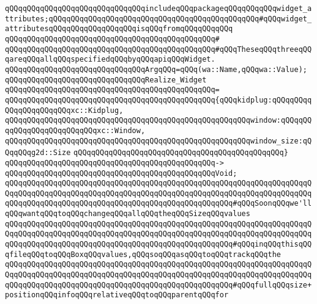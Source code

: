 \verb|qQQqqQQqqQQqqQQqqQQqqQQqqQQqqQQqincludeqQQqpackageqQQqqQQqqQQqwidget_attributes;qQQqqQQqqQQqqQQqqQQqqQQqqQQqqQQqqQQqqQQqqQQqqQQq#qQQqwidget_attributesqQQqqQQqqQQqqQQqqQQqisqQQqfromqQQqqQQqqQQq|\newline
\verb|qQQqqQQqqQQqqQQqqQQqqQQqqQQqqQQqqQQqqQQqqQQqqQQq#|\newline
\verb|qQQqqQQqqQQqqQQqqQQqqQQqqQQqqQQqqQQqqQQqqQQqqQQq#qQQqTheseqQQqthreeqQQqareqQQqallqQQqspecifiedqQQqbyqQQqapiqQQqWidget.|\newline
\newline
\verb|qQQqqQQqqQQqqQQqqQQqqQQqqQQqqQQqArgqQQq=qQQq(wa::Name,qQQqwa::Value);|\newline
\newline
\verb|qQQqqQQqqQQqqQQqqQQqqQQqqQQqqQQqRealize_Widget|\newline
\verb|qQQqqQQqqQQqqQQqqQQqqQQqqQQqqQQqqQQqqQQqqQQqqQQq=|\newline
\verb|qQQqqQQqqQQqqQQqqQQqqQQqqQQqqQQqqQQqqQQqqQQqqQQq{qQQqkidplug:qQQqqQQqqQQqqQQqqQQqqQQqxc::Kidplug,|\newline
\verb|qQQqqQQqqQQqqQQqqQQqqQQqqQQqqQQqqQQqqQQqqQQqqQQqqQQqqQQqwindow:qQQqqQQqqQQqqQQqqQQqqQQqqQQqxc::Window,|\newline
\verb|qQQqqQQqqQQqqQQqqQQqqQQqqQQqqQQqqQQqqQQqqQQqqQQqqQQqqQQqwindow_size:qQQqqQQqg2d::Size|\newline
\verb|qQQqqQQqqQQqqQQqqQQqqQQqqQQqqQQqqQQqqQQqqQQqqQQq}|\newline
\verb|qQQqqQQqqQQqqQQqqQQqqQQqqQQqqQQqqQQqqQQqqQQqqQQq->|\newline
\verb|qQQqqQQqqQQqqQQqqQQqqQQqqQQqqQQqqQQqqQQqqQQqqQQqVoid;|\newline
\verb|qQQqqQQqqQQqqQQqqQQqqQQqqQQqqQQqqQQqqQQqqQQqqQQqqQQqqQQqqQQqqQQqqQQqqQQqqQQqqQQqqQQqqQQqqQQqqQQqqQQqqQQqqQQqqQQqqQQqqQQqqQQqqQQqqQQqqQQqqQQqqQQqqQQqqQQqqQQqqQQqqQQqqQQqqQQqqQQqqQQqqQQqqQQqqQQq#qQQqSoonqQQqwe'llqQQqwantqQQqtoqQQqchangeqQQqallqQQqtheqQQqSizeqQQqvalues|\newline
\verb|qQQqqQQqqQQqqQQqqQQqqQQqqQQqqQQqqQQqqQQqqQQqqQQqqQQqqQQqqQQqqQQqqQQqqQQqqQQqqQQqqQQqqQQqqQQqqQQqqQQqqQQqqQQqqQQqqQQqqQQqqQQqqQQqqQQqqQQqqQQqqQQqqQQqqQQqqQQqqQQqqQQqqQQqqQQqqQQqqQQqqQQqqQQqqQQq#qQQqinqQQqthisqQQqfileqQQqtoqQQqBoxqQQqvalues,qQQqsoqQQqasqQQqtoqQQqtrackqQQqthe|\newline
\verb|qQQqqQQqqQQqqQQqqQQqqQQqqQQqqQQqqQQqqQQqqQQqqQQqqQQqqQQqqQQqqQQqqQQqqQQqqQQqqQQqqQQqqQQqqQQqqQQqqQQqqQQqqQQqqQQqqQQqqQQqqQQqqQQqqQQqqQQqqQQqqQQqqQQqqQQqqQQqqQQqqQQqqQQqqQQqqQQqqQQqqQQqqQQqqQQq#qQQqfullqQQqsize+positionqQQqinfoqQQqrelativeqQQqtoqQQqparentqQQqfor|\newline
